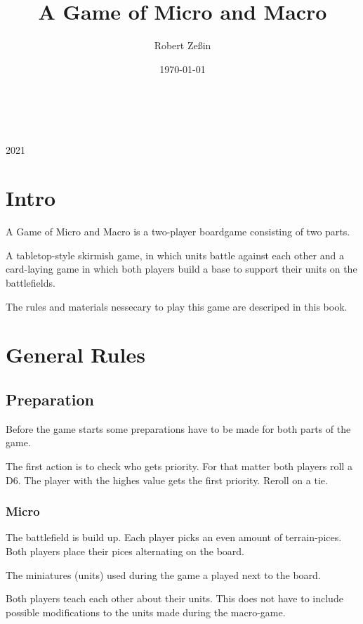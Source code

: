 \documentclass[a5paper,pagesize,10pt,bibtotoc,pointlessnumbers,
normalheadings,DIV=9,twoside=false]{scrbook}
\title{A Game of Micro and Macro}
\author{Robert Zeßin}
\date{\today}
\begin{document}
\begin{titlepage}
		\\
			
		\vspace{10mm}
		\\
		\vspace{\fill}
		\centering \large{2021}
\end{titlepage}

\newpage
\chapter{Intro}

A Game of Micro and Macro is a two-player boardgame consisting of two parts.

A tabletop-style skirmish game, in which units battle against each other and a card-laying game in which both players build a base to support their units on the battlefields.

The rules and materials nessecary to play this game are descriped in this book.

\newpage
\tableofcontents 


\newpage
\chapter{General Rules}

\section{Preparation}
Before the game starts some preparations have to be made for both parts of the game.

The first action is to check who gets priority. For that matter both players roll a D6. The player with the highes value gets the first priority. Reroll on a tie.

\subsection{Micro}
The battlefield is build up. Each player picks an even amount of terrain-pices. Both players place their pices alternating on the board.

The miniatures (units) used during the game a played next to the board.

Both players teach each other about their units. This does not have to include possible modifications to the units made during the macro-game.
\end{document}
